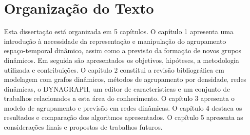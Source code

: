 \section{Organização do Texto}
Esta dissertação está organizada em 5 capítulos. O capítulo 1 apresenta uma
introdução à necessidade da representação e manipulação do agrupamento espaço-temporal
dinâmico, assim como a previsão da formação de novos grupos dinâmicos. Em seguida são apresentados os objetivos,
hipóteses, a metodologia utilizada e contribuições. O capítulo 2 constitui a revisão
bibliográfica em modelagem com grafos dinâmicos, métodos de agrupamento por densidade, redes dinâmicas,
o DYNAGRAPH, um editor de características e um conjunto de trabalhos relacionados a esta área do conhecimento.
O capítulo 3 apresenta o modelo de agrupamento e previsão em redes dinâmicas. O capítulo 4 destaca
os resultados e comparação dos algoritmos apresentados. O capítulo 5 apresenta as considerações finais
e propostas de trabalhos futuros.









